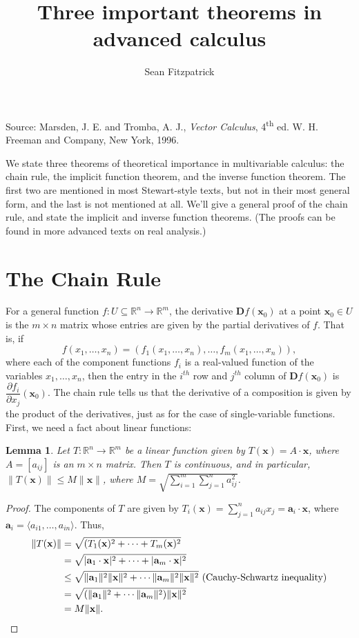 \documentclass[12pt,letterpaper]{article}
\title{Three important theorems in advanced calculus}
\author{Sean Fitzpatrick}
\newtheorem{lemma}[theorem]{Lemma}
\newcommand{\R}{\mathbb{R}}
\newcommand{\D}{\mathbf{D}}
\newcommand{\x}{\mathbf{x}}
\begin{document}
\maketitle
Source: Marsden, J. E. and Tromba, A. J., {\em Vector Calculus}, 4\textsuperscript{th} ed. W. H. Freeman and Company, New York, 1996.

We state three theorems of theoretical importance in multivariable calculus: the chain rule, the implicit function theorem, and the inverse function theorem. The first two are mentioned in most Stewart-style texts, but not in their most general form, and the last is not mentioned at all. We'll give a general proof of the chain rule, and state the implicit and inverse function theorems. (The proofs can be found in more advanced texts on real analysis.)
\section{The Chain Rule}
For a general function $f:U\subseteq \R^n\to \R^m$, the derivative $\D f(\x_0)$ at a point $\x_0\in U$ is the $m\times n$ matrix whose entries are given by the partial derivatives of $f$. That is, if 
\[
f(x_1,\ldots, x_n) = (f_1(x_1,\ldots, x_n),\ldots, f_m(x_1,\ldots, x_n)),
\]
where each of the component functions $f_i$ is a real-valued function of the variables $x_1,\ldots, x_n$, then the entry in the $i^{th}$ row and $j^{th}$ column of $\D f(\x_0)$ is $\dfrac{\partial f_i}{\partial x_j}(\x_0)$.
 The chain rule tells us that the derivative of a composition is given by the product of the derivatives, just as for the case of single-variable functions. First, we need a fact about linear functions:

\begin{lemma}
Let $T:\R^n\to \R^m$ be a linear function given by $T(\x) = A\cdot \x$, where $A=[a_{ij}]$ is an $m\times n$ matrix. Then $T$ is continuous, and in particular, $\lVert T(\x)\rVert \leq M\lVert \x\rVert$, where $M = \sqrt{\sum_{i=1}^m\sum_{j=1}^n a_{ij}^2}$.
\end{lemma}
\begin{proof}
The components of $T$ are given by $T_i(\x) = \sum_{j=1}^n a_{ij}x_j = \mathbf{a}_i\cdot \x$, where $\mathbf{a}_i = \langle a_{i1},\ldots, a_{in}\rangle$. Thus,
\begin{align*}
\lVert T(\x)\rVert &= \sqrt{(T_1(\x)^2+\cdots + T_m(\x)^2}\\
&= \sqrt{|\mathbf{a}_1\cdot\x|^2+\cdots +|\mathbf{a}_m\cdot \x|^2}\\
&\leq \sqrt{\lVert \mathbf{a}_1\rVert^2\lVert \x\rVert^2 +\cdots \lVert\mathbf{a}_m\rVert^2\lVert \x\rVert^2} \text{ (Cauchy-Schwartz inequality)}\\
&=\sqrt{(\lVert \mathbf{a}_1\rVert^2+\cdots \lVert \mathbf{a}_m\rVert^2)\lVert \x\rVert^2}\\
&=M\lVert \x\rVert.\qedhere
\end{align*}
\end{proof}
\end{document}
